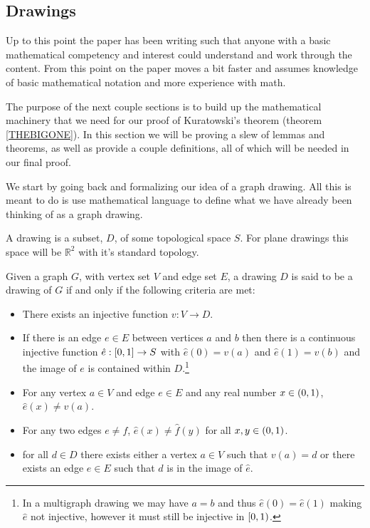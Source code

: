 \documentclass{article}
\begin{document}
\subsection{Drawings}
Up to this point the paper has been writing such that anyone with a basic mathematical competency and interest could understand and work through the content. From this point on the paper moves a bit faster and assumes knowledge of basic mathematical notation and more experience with math.

The purpose of the next couple sections is to build up the mathematical machinery that we need for our proof of Kuratowski's theorem (theorem \ref{THEBIGONE}). In this section we will be proving a slew of lemmas and theorems, as well as provide a couple definitions, all of which will be needed in our final proof.

We start by going back and formalizing our idea of a graph drawing. All this is meant to do is use mathematical language to define what we have already been thinking of as a graph drawing.

\begin{definition}[Drawing]
	A drawing is a subset, $D$, of some topological space $S$. For plane drawings this space will be $\mathbb R^2$ with it's standard topology.
\end{definition}

\begin{definition}
Given a graph $G$, with vertex set $V$ and edge set $E$, a drawing $D$ is said to be a drawing of $G$ if and only if the following criteria are met:
\begin{itemize}
	\item There exists an injective function $v:V\to D$.
	\item If there is an edge $e\in E$ between vertices $a$ and $b$ then there is a continuous injective function $\hat e:\left[ {0} , {1} \right]\to S$ with $\hat e(0) = v(a)$ and $\hat e(1) = v(b)$ and the image of $e$ is contained within $D$.\footnote{In a multigraph drawing we may have $a=b$ and thus $\hat e(0) = \hat e(1)$ making $\hat e$ not injective, however it must still be injective in $\left[ {0} , {1} \right)$.}
	\item For any vertex $a\in V$ and edge $e\in E$ and any real number $x\in\left( {0} , {1} \right)$, $\hat e(x)\not=v(a)$.
	\item For any two edges $e\not=f$, $\hat e(x) \not= \hat f(y)$ for all $x,y \in\left( {0} , {1} \right)$.
	\item for all $d\in D$ there exists either a vertex $a\in V$ such that $v(a) = d$ or there exists an edge $e\in E$ such that $d$ is in the image of $\hat e$.
\end{itemize}
\end{definition}
\end{document}
